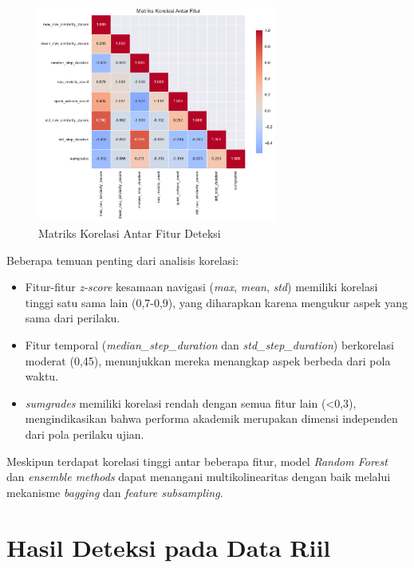\begin{figure}[htbp]
\centering
    \includegraphics[width=0.7\textwidth]{figures/feature_correlation_heatmap.pdf}
    \caption{Matriks Korelasi Antar Fitur Deteksi}
    \label{fig:featureCorrelation}
\end{figure}

Beberapa temuan penting dari analisis korelasi:
\begin{itemize}
    \item Fitur-fitur \textit{z-score} kesamaan navigasi (\textit{max}, \textit{mean}, \textit{std}) memiliki korelasi tinggi satu sama lain (0,7-0,9), yang diharapkan karena mengukur aspek yang sama dari perilaku.
    \item Fitur temporal (\textit{median\_step\_duration} dan \textit{std\_step\_duration}) berkorelasi moderat (0,45), menunjukkan mereka menangkap aspek berbeda dari pola waktu.
    \item \textit{sumgrades} memiliki korelasi rendah dengan semua fitur lain (<0,3), mengindikasikan bahwa performa akademik merupakan dimensi independen dari pola perilaku ujian.
\end{itemize}

Meskipun terdapat korelasi tinggi antar beberapa fitur, model \textit{Random Forest} dan \textit{ensemble methods} dapat menangani multikolinearitas dengan baik melalui mekanisme \textit{bagging} dan \textit{feature subsampling}.

\section{Hasil Deteksi pada Data Riil}
\label{sec:hasilDeteksiDataRiil}

